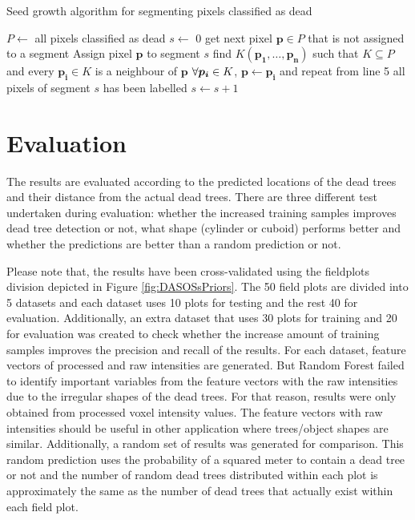 \documentclass{subfiles}
\begin{document}
 \begin{algorithm}
 	\caption{Seed growth algorithm for segmenting pixels classified as dead}
 	\label{alg:seedGrownth}
 	\centering
 	\begin{algorithmic}[1]
 		\State $P \gets $ all pixels classified as dead  %
 		\State $s \gets $ 0 
        \State get next pixel $\boldsymbol{p} \in P$ that is not assigned to a segment
 		\State  Assign pixel $\boldsymbol{p} $ to segment $s$
 		\State  find $K(\boldsymbol{p_1},\dots, \boldsymbol{p_n})$ such that $K \subseteq P$ and every $\boldsymbol{p_i} \in K$ is a neighbour of $\boldsymbol{p}$
 		\State $ \forall \space \boldsymbol{p_i} \in K $, $\boldsymbol{p} \gets \boldsymbol{p_i}$ and repeat from line 5
 		\State all pixels of segment $s$ has been labelled
 		\State $s \gets s + 1 $
 		\EndWhile
 	\end{algorithmic}
 \end{algorithm}



\section{Evaluation} 


    
\par The results are evaluated according to the predicted locations of the dead trees and their distance from the actual dead trees. There are three different test undertaken during evaluation: whether the increased training samples improves dead tree detection or not, what shape (cylinder or cuboid) performs better and whether the predictions are better than a random prediction or not. 
   
   \par Please note that, the results have been cross-validated using the fieldplots division depicted in Figure \ref{fig:DASOSsPriors}. The 50 field plots are divided into 5 datasets and each dataset uses 10 plots for testing and the rest 40 for evaluation. Additionally, an extra dataset that uses 30 plots for training and 20 for evaluation was created to check whether the increase amount of training samples improves the precision and recall of the results. For each dataset, feature vectors of processed and raw intensities are generated. But Random Forest failed to identify important variables from the feature vectors with the raw intensities due to the irregular shapes of the dead trees. For that reason, results were only obtained from processed voxel intensity values. The feature vectors with raw intensities should be useful in other application where trees/object shapes are similar. Additionally, a random set of results was generated for comparison. This random prediction uses the probability of a squared meter to contain a dead tree or not and the number of random dead trees distributed within each plot is approximately the same as the number of dead trees that actually exist within each field plot.
   
\end{document}

